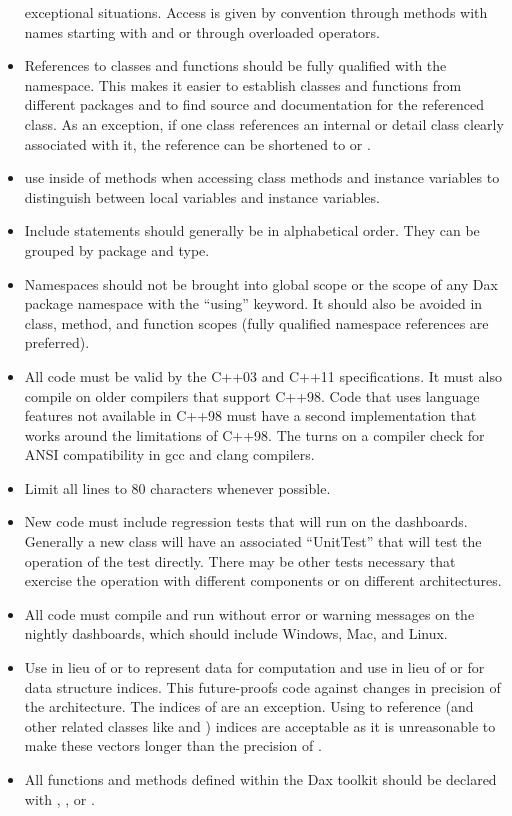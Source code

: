 \begin{itemize}
  exceptional situations. Access is given by convention through methods
  with names starting with  and  or through
  overloaded operators.
\item References to classes and functions should be fully qualified with
  the namespace. This makes it easier to establish classes and functions
  from different packages and to find source and documentation for the
  referenced class. As an exception, if one class references an internal or
  detail class clearly associated with it, the reference can be shortened
  to  or .
\item use  inside of methods when accessing class methods
  and instance variables to distinguish between local variables and
  instance variables.
\item Include statements should generally be in alphabetical order. They
  can be grouped by package and type.
\item Namespaces should not be brought into global scope or the scope of
  any Dax package namespace with the ``using'' keyword. It should also be
  avoided in class, method, and function scopes (fully qualified namespace
  references are preferred).
\item All code must be valid by the C++03 and C++11 specifications. It must
  also compile on older compilers that support C++98. Code that uses
  language features not available in C++98 must have a second
  implementation that works around the limitations of C++98. The
   turns on a compiler check for ANSI
  compatibility in gcc and clang compilers.
\item Limit all lines to 80 characters whenever possible.
\item New code must include regression tests that will run on the
  dashboards. Generally a new class will have an associated ``UnitTest''
  that will test the operation of the test directly. There may be other
  tests necessary that exercise the operation with different components or
  on different architectures.
\item All code must compile and run without error or warning messages on
  the nightly dashboards, which should include Windows, Mac, and Linux.
\item Use  in lieu of  or  to
  represent data for computation and use  in lieu of 
  or  for data structure indices. This future-proofs code
  against changes in precision of the architecture. The indices of
   are an exception. Using  to reference
   (and other related classes like  and
  ) indices are acceptable as it is unreasonable to make
  these vectors longer than the precision of .
\item All functions and methods defined within the Dax toolkit should be
  declared with \daxcontexport, \daxexecexport, or \daxexeccontexport.
\end{itemize}

